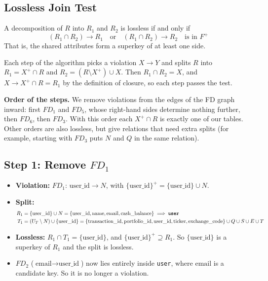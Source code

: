 \documentclass{article}
\newcommand{\at}[1]{\text{#1}}
\newcommand{\cl}[1]{\{#1\}^+}
\begin{document}
\subsection*{Lossless Join Test}

A decomposition of $R$ into $R_1$ and $R_2$ is lossless if and only if
\[
  (R_1 \cap R_2) \rightarrow R_1 \quad \text{or} \quad (R_1 \cap R_2) \rightarrow R_2 \quad \text{is in } F^+
\]
That is, the shared attributes form a superkey of at least one side.

Each step of the algorithm picks a violation $X \rightarrow Y$ and splits $R$ into $R_1 = X^+ \cap R$ and $R_2 = (R \setminus X^+) \cup X$. Then $R_1 \cap R_2 = X$, and $X \rightarrow X^+ \cap R = R_1$ by the definition of closure, so each step passes the test.

\textbf{Order of the steps.} We remove violations from the edges of the FD graph inward: first $FD_1$ and $FD_5$, whose right-hand sides determine nothing further, then $FD_6$, then $FD_3$. With this order each $X^+ \cap R$ is exactly one of our tables. Other orders are also lossless, but give relations that need extra splits (for example, starting with $FD_3$ puts $N$ and $Q$ in the same relation).

\subsection*{Step 1: Remove $FD_1$}

\begin{itemize}[leftmargin=*]
  \item \textbf{Violation:} $FD_1$: $\at{user\_id} \rightarrow N$, with $\cl{\at{user\_id}} = \{\at{user\_id}\} \cup N$.
  \item \textbf{Split:}
  \begin{align*}
    R_1 &= \{\at{user\_id}\} \cup N = \{\at{user\_id}, \at{name}, \at{email}, \at{cash\_balance}\} \implies \textbf{\texttt{user}} \\
    T_1 &= (U_T \setminus N) \cup \{\at{user\_id}\} = \{\at{transaction\_id}, \at{portfolio\_id}, \at{user\_id}, \at{ticker}, \at{exchange\_code}\} \cup Q \cup S \cup E \cup T
  \end{align*}
  \item \textbf{Lossless:} $R_1 \cap T_1 = \{\at{user\_id}\}$, and $\cl{\at{user\_id}} \supseteq R_1$. So $\{\at{user\_id}\}$ is a superkey of $R_1$ and the split is lossless.
  \item $FD_2$ ($\at{email} \rightarrow \at{user\_id}$) now lies entirely inside \texttt{user}, where $\at{email}$ is a candidate key. So it is no longer a violation.
\end{itemize}
\end{document}
